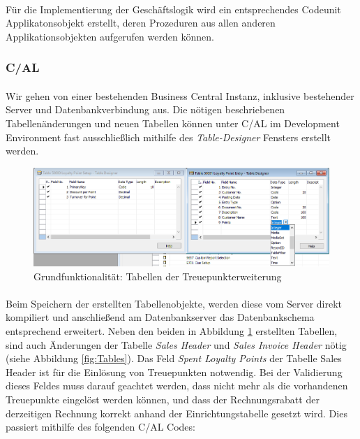 \paragraph{}
Für die Implementierung der Geschäftslogik wird ein entsprechendes Codeunit Applikatonsobjekt erstellt, deren Prozeduren aus allen anderen Applikationsobjekten aufgerufen werden können.

\subsubsection{C/AL}
\paragraph{}
Wir gehen von einer bestehenden Business Central Instanz, inklusive bestehender Server und Datenbankverbindung aus. Die nötigen beschriebenen Tabellenänderungen und neuen Tabellen können unter C/AL im Development Environment fast ausschließlich mithilfe des \textit{Table-Designer} Fensters erstellt werden.
\begin{figure}[h]
	\centering
	\includegraphics[width=130mm]{images/CALTableDesigner}
	\caption{Grundfunktionalität: Tabellen der Treuepunkterweiterung}
	\label{fig:Table Designer}
\end{figure}

\paragraph{}
Beim Speichern der erstellten Tabellenobjekte, werden diese vom Server direkt kompiliert und anschließend am Datenbankserver das Datenbankschema entsprechend erweitert. Neben den beiden in Abbildung \ref{fig:Table Designer} erstellten Tabellen, sind auch Änderungen der Tabelle \textit{Sales Header} und \textit{Sales Invoice Header} nötig (siehe Abbildung \ref{fig:Tables}). Das Feld \textit{Spent Loyalty Points} der Tabelle {Sales Header} ist für die Einlösung von Treuepunkten notwendig. Bei der Validierung dieses Feldes muss darauf geachtet werden, dass nicht mehr als die vorhandenen Treuepunkte eingelöst werden können, und dass der Rechnungsrabatt der derzeitigen Rechnung korrekt anhand der Einrichtungstabelle gesetzt wird. Dies passiert mithilfe des folgenden C/AL Codes:

